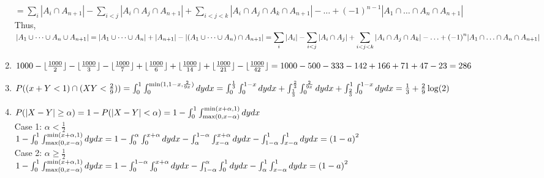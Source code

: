 \documentclass[10pt]{article}
\begin{document}
\begin{enumerate}[label= (Q-\arabic*)]
    $\displaystyle=\sum_{i}|A_i\cap A_{n+1}|-\sum_{i<j}|A_i\cap A_j\cap A_{n+1}|+\sum_{i<j<k}|A_i\cap A_j\cap A_k\cap A_{n+1}|-\ldots+{(-1)}^{n-1}|A_1\cap\ldots\cap A_n\cap A_{n+1}|$\\
    Thus, $\displaystyle |A_1\cup\cdots\cup A_n\cup A_{n+1}|=|A_1\cup\cdots\cup A_n|+|A_{n+1}|-|(A_1\cup\cdots\cup A_n)\cap A_{n+1}|\\
    =\sum_{i}|A_i|-\sum_{i<j}|A_i\cap A_j|+\sum_{i<j<k}|A_i\cap A_j\cap A_k|-\ldots+{(-1)}^{n}|A_1\cap\ldots\cap A_n\cap A_{n+1}|$
    \item $1000-\lfloor\frac{1000}{2}\rfloor-\lfloor\frac{1000}{3}\rfloor-\lfloor\frac{1000}{7}\rfloor+\lfloor\frac{1000}{6}\rfloor+\lfloor\frac{1000}{14}\rfloor+\lfloor\frac{1000}{21}\rfloor-\lfloor\frac{1000}{42}\rfloor\\
    =1000-500-333-142+166+71+47-23=286$
    \item $P((x+Y<1)\cap (XY<\frac{2}{9}))\\
    =\int_{0}^{1}\int_{0}^{\min(1,1-x,\frac{2}{9x})}dydx=\int_{0}^{\frac{1}{3}}\int_{0}^{1-x}dydx+\int_{\frac{1}{3}}^{\frac{2}{3}}\int_{0}^{\frac{2}{9x}}dydx+\int_{\frac{2}{3}}^{1}\int_{0}^{1-x}dydx=\frac{1}{3}+\frac{2}{9}\log(2)$
    \item $P(|X-Y|\ge\alpha)=1-P(|X-Y|<\alpha)\\
    =1-\int_{0}^{1}\int_{\max(0,x-\alpha)}^{\min(x+\alpha,1)}dydx$\\
    Case 1: $\alpha<\frac{1}{2}$\\
    $1-\int_{0}^{1}\int_{\max(0,x-\alpha)}^{\min(x+\alpha,1)}dydx=1-\int_{0}^{\alpha}\int_{0}^{x+\alpha}dydx-\int_{\alpha}^{1-\alpha}\int_{x-\alpha}^{x+\alpha}dydx-\int_{1-\alpha}^{1}\int_{x-\alpha}^{1}dydx\\
    ={(1-a)}^2$\\
    Case 2: $\alpha\ge\frac{1}{2}$\\
    $1-\int_{0}^{1}\int_{\max(0,x-\alpha)}^{\min(x+\alpha,1)}dydx=1-\int_{0}^{1-\alpha}\int_{0}^{x+\alpha}dydx-\int_{1-\alpha}^{\alpha}\int_{0}^{1}dydx-\int_{\alpha}^{1}\int_{x-\alpha}^{1}dydx\\
    ={(1-a)}^2$
\end{enumerate}
\end{document}
